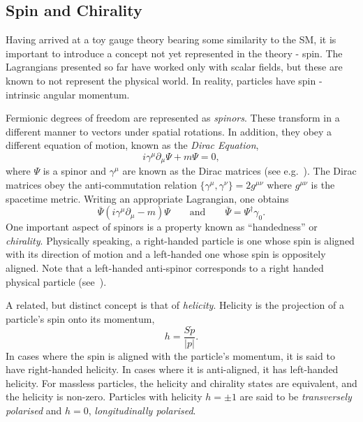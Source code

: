 \subsection{Spin and Chirality}
Having arrived at a toy gauge theory bearing some similarity to the \ac{SM}, it
is important to introduce a concept not yet represented in the theory -
spin. The Lagrangians presented so far have worked only with scalar fields, but
these are known to not represent the physical world. In reality, particles have
spin - intrinsic angular momentum.

Fermionic degrees of freedom are represented as \emph{spinors}. These transform
in a different manner to vectors under spatial rotations. In addition, they obey
a different equation of motion, known as the \emph{Dirac Equation},
\begin{equation*}
i\gamma^\mu \partial_{\mu}\Psi + m\Psi = 0,
\end{equation*}
where $\Psi$ is a spinor and $\gamma^{\mu}$ are known as the Dirac matrices
(see e.g.~\cite{aitchison}). The Dirac matrices obey the anti-commutation
relation $\{\gamma^{\mu}, \gamma^{\nu}\} = 2g^{\mu\nu}$ where $g^{\mu\nu}$ is
the spacetime metric. Writing an appropriate Lagrangian, one obtains
\begin{equation*}
\bar{\Psi} \left (i\gamma^{\mu}\partial_{\mu} -m\right)\Psi \qquad \textrm{and} \qquad \bar{\Psi} =
\Psi^{\dagger}\gamma_0.
\end{equation*}
One important aspect of spinors is a property known as ``handedness'' or
\emph{chirality}. Physically speaking, a right-handed particle is one whose spin
is aligned with its direction of motion and a left-handed one whose spin is
oppositely aligned. Note that a left-handed anti-spinor corresponds to a right
handed physical particle (see~\cite{peskin_schroeder}).

A related, but distinct concept is that of \emph{helicity}. Helicity is the
projection of a particle's spin onto its momentum,
\begin{equation*}
h = \frac{S\dot p}{\left|p\right|}.
\end{equation*}
In cases where the spin is aligned with the particle's momentum, it is said to
have right-handed helicity. In cases where it is anti-aligned, it has
left-handed helicity. For massless particles, the helicity and chirality states
are equivalent, and the helicity is non-zero. Particles with helicity $h=\pm 1$
are said to be \emph{transversely polarised} and $h=0$, \emph{longitudinally
  polarised}.

